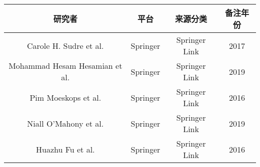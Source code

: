 \begin{center}
\begin{tabular}{cccc}
\hline
研究者 & 平台 & 来源分类 & 备注年份  \\
\hline
Carole H. Sudre et al. \cite{carole2017} & Springer & Springer Link & 2017 \\
Mohammad Hesam Hesamian et al. \cite{hesamian2019} & Springer & Springer Link & 2019 \\
Pim Moeskops et al. \cite{pimmoeskops2016} & Springer & Springer Link & 2016 \\
Niall O’Mahony et al. \cite{niall2019} & Springer & Springer Link & 2019 \\
Huazhu Fu et al. \cite{huazhufu2016} & Springer & Springer Link & 2016 \\
\hline
\end{tabular}
\end{center}


